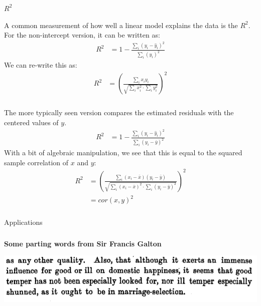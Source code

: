 \begin{frame}[fragile] \frametitle{}

{\color{yaleblue}\fontsize{16pt}{20pt}\selectfont $R^2$}

A common measurement of how well a linear model explains
the data is the $R^2$. For the non-intercept version, it
can be written as:
\begin{align*}
R^2 &= 1 - \frac{\sum_i (y_i - \widehat{y}_i)^2}{\sum_i (y_i)^2}
\end{align*}
\pause We can re-write this as:
\begin{align*}
R^2 &= \left( \frac{\sum_i x_i y_i}{\sqrt{\sum_i x_i^2 \cdot \sum_i y_i^2}} \right)^2
\end{align*}

\end{frame}

\begin{frame}[fragile] \frametitle{}

The more typically seen version compares the estimated
residuals with the centered values of $y$.
\begin{align*}
R^2 &= 1 - \frac{\sum_i (y_i - \widehat{y}_i)^2}{\sum_i (y_i - \bar{y})^2}
\end{align*}
\pause With a bit of algebraic manipulation, we see that this is
equal to the squared sample correlation of $x$ and $y$:
\begin{align*}
R^2 &= \left( \frac{\sum_i (x_i - \bar{x})(y_i - \bar{y})}{\sqrt{\sum_i (x_i - \bar{x})^2 \cdot \sum_i (y_i - \bar{y})^2}} \right)^2 \\
&= cor(x,y)^2
\end{align*}

\end{frame}

\begin{frame}[fragile] \frametitle{}

\begin{flushright}
{\color{yaleblue}\sc\fontsize{1cm}{0cm}\selectfont Applications}
\end{flushright}

\end{frame}


\begin{frame}[fragile] \frametitle{}

{\bf Some parting words from Sir Francis Galton}

\begin{center}
\includegraphics[width=0.95\linewidth]{img/galton_quote.png}
\end{center}

\end{frame}














